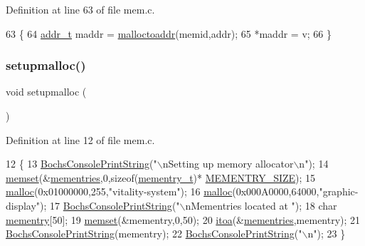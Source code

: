 Definition at line 63 of file mem.\+c.


\begin{DoxyCode}
63                                                        \{
64     \hyperlink{a00095_a295f71165288684c38c6bb836fbb3c59_a295f71165288684c38c6bb836fbb3c59}{addr\_t} maddr = \hyperlink{a00107_ae024364045572d15f9b90b8a046d6807_ae024364045572d15f9b90b8a046d6807}{malloctoaddr}(memid,addr);
65     *maddr = v;
66 \}
\end{DoxyCode}
\mbox{\label{a00110_a1add491f9ef2f8830ed5108f8dbc0ff2_a1add491f9ef2f8830ed5108f8dbc0ff2}} 
\subsubsection{\texorpdfstring{setupmalloc()}{setupmalloc()}}
{\footnotesize\ttfamily void setupmalloc (\begin{DoxyParamCaption}{ }\end{DoxyParamCaption})}



Definition at line 12 of file mem.\+c.


\begin{DoxyCode}
12                    \{
13     \hyperlink{a00041_a19e1f554d03c977f8b947f21489daa41_a19e1f554d03c977f8b947f21489daa41}{BochsConsolePrintString}(\textcolor{stringliteral}{"\(\backslash\)nSetting up memory allocator\(\backslash\)n"});
14     \hyperlink{a00089_a9e432f267691eceb2e2e0efcc37efbc9_a9e432f267691eceb2e2e0efcc37efbc9}{memset}(&\hyperlink{a00107_a9ec3d7a60bca9bd965aba15905c6d1ed_a9ec3d7a60bca9bd965aba15905c6d1ed}{mementries},0,\textcolor{keyword}{sizeof}(\hyperlink{a00164}{mementry\_t})*
      \hyperlink{a00107_a48623ea6ed429e2f046b49041dde1dc5_a48623ea6ed429e2f046b49041dde1dc5}{MEMENTRY\_SIZE});
15     \hyperlink{a00107_a9087e3504e5973deee6f3561705978c7_a9087e3504e5973deee6f3561705978c7}{malloc}(0x01000000,255,\textcolor{stringliteral}{"vitality-system"});
16     \hyperlink{a00107_a9087e3504e5973deee6f3561705978c7_a9087e3504e5973deee6f3561705978c7}{malloc}(0x000A0000,64000,\textcolor{stringliteral}{"graphic-display"});
17     \hyperlink{a00041_a19e1f554d03c977f8b947f21489daa41_a19e1f554d03c977f8b947f21489daa41}{BochsConsolePrintString}(\textcolor{stringliteral}{"\(\backslash\)nMementries located at "});
18     \textcolor{keywordtype}{char} \hyperlink{a00164}{mementry}[50];
19     \hyperlink{a00089_a9e432f267691eceb2e2e0efcc37efbc9_a9e432f267691eceb2e2e0efcc37efbc9}{memset}(&mementry,0,50);
20     \hyperlink{a00083_af749add1ff19b6ff96a62f35ebb49b7e_af749add1ff19b6ff96a62f35ebb49b7e}{itoa}(&\hyperlink{a00107_a9ec3d7a60bca9bd965aba15905c6d1ed_a9ec3d7a60bca9bd965aba15905c6d1ed}{mementries},mementry);
21     \hyperlink{a00041_a19e1f554d03c977f8b947f21489daa41_a19e1f554d03c977f8b947f21489daa41}{BochsConsolePrintString}(mementry);
22     \hyperlink{a00041_a19e1f554d03c977f8b947f21489daa41_a19e1f554d03c977f8b947f21489daa41}{BochsConsolePrintString}(\textcolor{stringliteral}{"\(\backslash\)n"});
23 \}
\end{DoxyCode}
